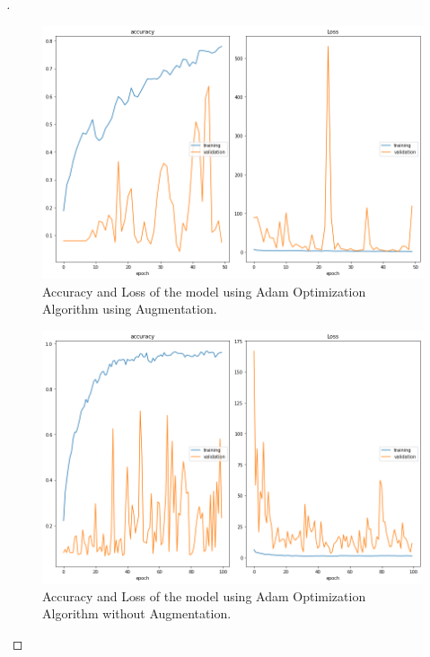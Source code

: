 \documentclass[12pt,oneside,geqno]{article}
\begin{document}
\begin{proof}[\color{red}{Solution}]
		\begin{figure}
			\centering
			\includegraphics[width=\textwidth]{../figs/adam_aug_acc_loss.png}
			\caption{Accuracy and Loss of the model using Adam Optimization Algorithm using Augmentation.}
			\label{img:adam_aug}
		\end{figure}
		
		
		\begin{figure}
			\centering
			\includegraphics[width=\textwidth]{../figs/adam_acc_loss_100.png}
			\caption{Accuracy and Loss of the model using Adam Optimization Algorithm without Augmentation.}
			\label{img:adam_100}
		\end{figure}
		

\end{proof}
\end{document}
